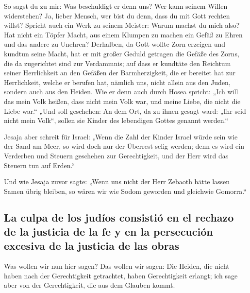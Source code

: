  So sagst du zu mir: Was beschuldigt er denn uns? Wer
kann seinem Willen widerstehen?  Ja, lieber Mensch, wer
bist du denn, dass du mit Gott rechten willst? Spricht auch ein Werk zu
seinem Meister: Warum machst du mich also?  Hat nicht ein
Töpfer Macht, aus einem Klumpen zu machen ein Gefäß zu Ehren und das
andere zu Unehren?  Derhalben, da Gott wollte Zorn
erzeigen und kundtun seine Macht, hat er mit großer Geduld getragen die
Gefäße des Zorns, die da zugerichtet sind zur Verdammnis;
 auf dass er kundtäte den Reichtum seiner Herrlichkeit an
den Gefäßen der Barmherzigkeit, die er bereitet hat zur Herrlichkeit,
 welche er berufen hat, nämlich uns, nicht allein aus den
Juden, sondern auch aus den Heiden.  Wie er denn auch
durch Hosea spricht: „Ich will das mein Volk heißen, dass nicht mein
Volk war, und meine Liebe, die nicht die Liebe war.`` 
„Und soll geschehen: An dem Ort, da zu ihnen gesagt ward: „Ihr seid
nicht mein Volk``, sollen sie Kinder des lebendigen Gottes genannt
werden.``

 Jesaja aber schreit für Israel: „Wenn die Zahl der
Kinder Israel würde sein wie der Sand am Meer, so wird doch nur der
Überrest selig werden;  denn es wird ein Verderben und
Steuern geschehen zur Gerechtigkeit, und der Herr wird das Steuern tun
auf Erden.``

 Und wie Jesaja zuvor sagte: „Wenn uns nicht der Herr
Zebaoth hätte lassen Samen übrig bleiben, so wären wir wie Sodom
geworden und gleichwie Gomorra.``

\hypertarget{la-culpa-de-los-juduxedos-consistiuxf3-en-el-rechazo-de-la-justicia-de-la-fe-y-en-la-persecuciuxf3n-excesiva-de-la-justicia-de-las-obras}{%
\subsection{La culpa de los judíos consistió en el rechazo de la
justicia de la fe y en la persecución excesiva de la justicia de las
obras}\label{la-culpa-de-los-juduxedos-consistiuxf3-en-el-rechazo-de-la-justicia-de-la-fe-y-en-la-persecuciuxf3n-excesiva-de-la-justicia-de-las-obras}}

 Was wollen wir nun hier sagen? Das wollen wir sagen: Die
Heiden, die nicht haben nach der Gerechtigkeit getrachtet, haben
Gerechtigkeit erlangt; ich sage aber von der Gerechtigkeit, die aus dem
Glauben kommt.

